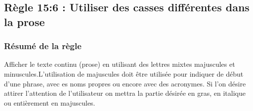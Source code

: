 \documentclass{article}[12pt]
\begin{document}

    \subsection{Règle 15:6 : Utiliser des casses différentes dans la prose}
    \subsubsection*{Résumé de la règle}
    Afficher le texte continu (prose) en utilisant des lettres mixtes majuscules et minuscules.L'utilisation de majuscules doit être utilisée pour indiquer de début d'une phrase, avec es noms propres ou encore avec des acronymes. Si l'on désire attirer l'attention de l'utilisateur on mettra la partie désirée en gras, en italique ou entièrement en majuscules.
    	\newpage
\end{document}
